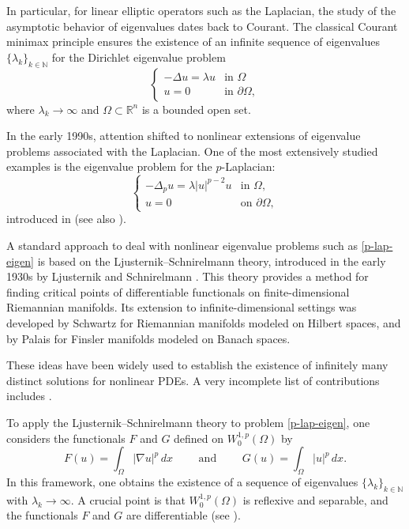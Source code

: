 \documentclass{amsart}
\newcommand{\R}{{\mathbb R}}
\newcommand{\N}{{\mathbb N}}
\theoremstyle{remark}
\theoremstyle{definition}
\numberwithin{equation}{section}
\begin{document}
In particular, for linear elliptic operators such as the Laplacian, the study of the asymptotic behavior of eigenvalues dates back to Courant. The classical Courant minimax principle ensures the existence of an infinite sequence of eigenvalues $\{\lambda_k\}_{k\in \N}$ for the Dirichlet eigenvalue problem
$$
\begin{cases}
-\Delta u = \lambda u & \text{in }\Omega\\
u=0 & \text{in } \partial\Omega,
\end{cases}
$$
where $\lambda_k \to \infty$ and $\Omega \subset \R^n$ is a bounded open set.

In the early 1990s, attention shifted to nonlinear extensions of eigenvalue problems associated with the Laplacian. One of the most extensively studied examples is the eigenvalue problem for the $p$-Laplacian:
\begin{equation}\label{p-lap-eigen}
\begin{cases}
-\Delta_p u = \lambda |u|^{p-2}u & \text{in }\Omega,\\
u=0 & \text{on } \partial\Omega,
\end{cases}
\end{equation}
introduced in \cite{L} (see also \cite{L2, L3}).

A standard approach to deal with nonlinear eigenvalue problems such as \eqref{p-lap-eigen} is based on the Ljusternik--Schnirelmann theory, introduced in the early 1930s by Ljusternik and Schnirelmann \cite{LS}. This theory provides a method for finding critical points of differentiable functionals on finite-dimensional Riemannian manifolds. Its extension to infinite-dimensional settings was developed by Schwartz \cite{Schwartz1,Schwartz} for Riemannian manifolds modeled on Hilbert spaces, and by Palais \cite{Palais} for Finsler manifolds modeled on Banach spaces.

These ideas have been widely used to establish the existence of infinitely many distinct solutions for nonlinear PDEs. A very incomplete list of contributions includes \cite{Berger, Browder1, Browder2, Browder3, Browder4, Coffman1, Coffman2, Coffman3, Krasnoselskii1956, Vainberg}.

To apply the Ljusternik--Schnirelmann theory to problem \eqref{p-lap-eigen}, one considers the functionals $F$ and $G$ defined on $W_0^{1,p}(\Omega)$ by
$$
F(u)=\int_\Omega |\nabla u|^p\,dx\qquad  \text{ and }\qquad G(u)=\int_\Omega|u|^p\,dx.
$$
In this framework, one obtains the existence of a sequence of eigenvalues $\{\lambda_k\}_{k\in\N}$ with $\lambda_k \to \infty$. A crucial point is that $W_0^{1,p}(\Omega)$ is reflexive and separable, and the functionals $F$ and $G$ are differentiable (see \cite{FuNe, FuNeSoSo, Zei80}).
\end{document}
